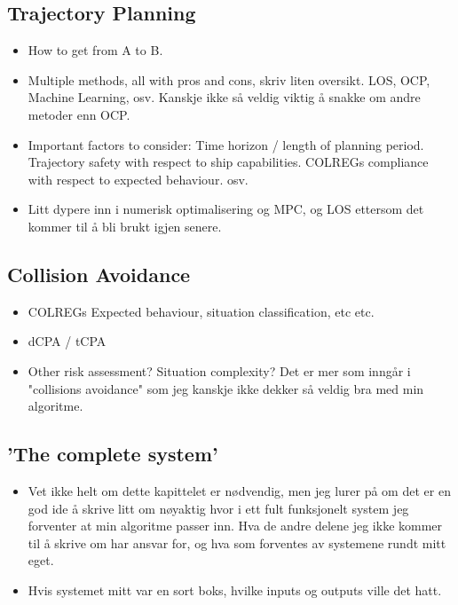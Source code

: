 \subsection{Trajectory Planning}
\begin{itemize}
    \item How to get from A to B.
    \item Multiple methods, all with pros and cons, skriv liten oversikt.
    \subitem LOS, OCP, Machine Learning, osv.
    \subitem Kanskje ikke så veldig viktig å snakke om andre metoder enn OCP.  
    \item Important factors to consider:
    \subitem Time horizon / length of planning period.
    \subitem Trajectory safety with respect to ship capabilities.
    \subitem COLREGs compliance with respect to expected behaviour.
    \subitem osv.
    \item Litt dypere inn i numerisk optimalisering og MPC, og LOS ettersom det kommer til å bli brukt igjen senere.
\end{itemize}


\subsection{Collision Avoidance}
\begin{itemize}
    \item COLREGs
    \subitem Expected behaviour, situation classification, etc etc.
    \item dCPA / tCPA
    \item Other risk assessment? Situation complexity? Det er mer som inngår i "collisions avoidance" som jeg kanskje ikke dekker så veldig bra med min algoritme.
\end{itemize}

\subsection{'The complete system'}
\begin{itemize}
    \item Vet ikke helt om dette kapittelet er nødvendig, men jeg lurer på om det er en god ide å skrive litt om nøyaktig hvor i ett fult funksjonelt
    system jeg forventer at min algoritme passer inn. Hva de andre delene jeg ikke kommer til å skrive om har ansvar for, og hva som forventes av systemene
    rundt mitt eget.
    \item Hvis systemet mitt var en sort boks, hvilke inputs og outputs ville det hatt.
\end{itemize}



\newpage